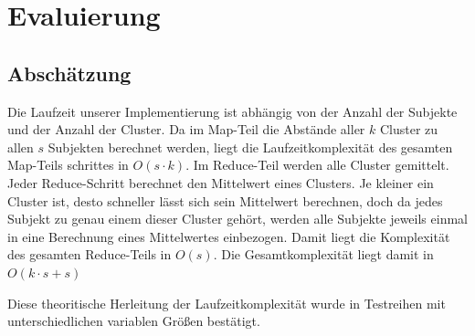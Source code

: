 \documentclass[a4paper]{llncs}
\begin{document}
\section{Evaluierung}

\subsection{Abschätzung}
Die Laufzeit unserer Implementierung ist abhängig von der Anzahl der Subjekte und der Anzahl der Cluster. Da im Map-Teil die Abstände aller $k$ Cluster zu allen $s$ Subjekten berechnet werden, liegt die Laufzeitkomplexität des gesamten Map-Teils schrittes in $O(s \cdot k)$. Im Reduce-Teil werden alle Cluster gemittelt. Jeder Reduce-Schritt berechnet den Mittelwert eines Clusters. Je kleiner ein Cluster ist, desto schneller lässt sich sein Mittelwert berechnen, doch da jedes Subjekt zu genau einem dieser Cluster gehört, werden alle Subjekte jeweils einmal in eine Berechnung eines Mittelwertes einbezogen. Damit liegt die Komplexität des gesamten Reduce-Teils in $O(s)$.
Die Gesamtkomplexität liegt damit in $O(k \cdot s + s)$

Diese theoritische Herleitung der Laufzeitkomplexität wurde in Testreihen mit unterschiedlichen variablen Größen bestätigt.
\end{document}
